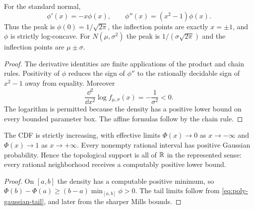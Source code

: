 \begin{proposition}\label{prop:shape}
For the standard normal,
\[
 \phi'(x)=-x\phi(x),\qquad \phi''(x)=(x^2-1)\phi(x).
\]
Thus the peak is $\phi(0)=1/\sqrt{2\pi}$, the inflection points are exactly $x=\pm1$, and $\phi$ is strictly log-concave.  For $N(\mu,\sigma^2)$ the peak is $1/(\sigma\sqrt{2\pi})$ and the inflection points are $\mu\pm\sigma$.
\end{proposition}

\begin{proof}
The derivative identities are finite applications of the product and chain rules.  Positivity of $\phi$ reduces the sign of $\phi''$ to the rationally decidable sign of $x^2-1$ away from equality.  Moreover
\[
 \frac{\dd^2}{\dd x^2}\log f_{\mu,\sigma}(x)=-\frac1{\sigma^2}<0.
\]
The logarithm is permitted because the density has a positive lower bound on every bounded parameter box.  The affine formulas follow by the chain rule.
\end{proof}

\begin{corollary}\label{cor:support}
The CDF is strictly increasing, with effective limits $\Phi(x)\to0$ as $x\to-\infty$ and $\Phi(x)\to1$ as $x\to+\infty$.  Every nonempty rational interval has positive Gaussian probability.  Hence the topological support is all of $\mathbb R$ in the represented sense: every rational neighborhood receives a computably positive lower bound.
\end{corollary}

\begin{proof}
On $[a,b]$ the density has a computable positive minimum, so
$\Phi(b)-\Phi(a)\ge(b-a)\min_{[a,b]}\phi>0$.  The tail limits follow from \eqref{eq:poly-gaussian-tail}, and later from the sharper Mills bounds.
\end{proof}
